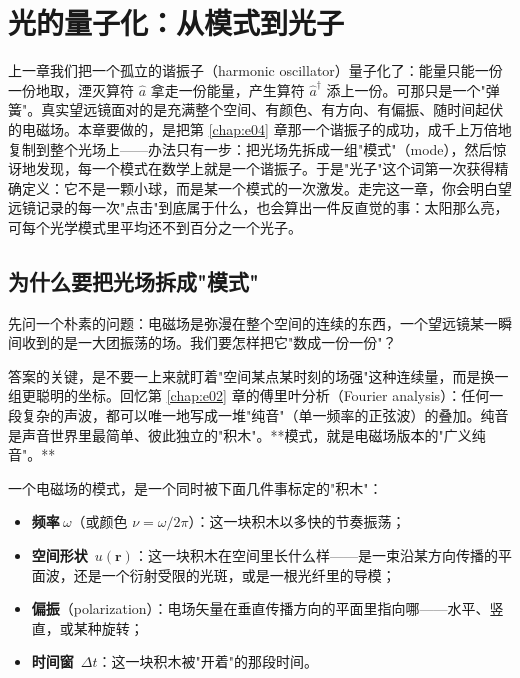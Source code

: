 \chapter{光的量子化：从模式到光子}
\label{chap:e05}

\begin{chapteropening}
上一章我们把一个孤立的谐振子（harmonic oscillator）量子化了：能量只能一份一份地取，湮灭算符 \(\hat a\) 拿走一份能量，产生算符 \(\hat a^\dagger\) 添上一份。可那只是一个"弹簧"。真实望远镜面对的是充满整个空间、有颜色、有方向、有偏振、随时间起伏的电磁场。本章要做的，是把第 \ref{chap:e04} 章那一个谐振子的成功，成千上万倍地复制到整个光场上——办法只有一步：把光场先拆成一组"模式"（mode），然后惊讶地发现，每一个模式在数学上就是一个谐振子。于是"光子"这个词第一次获得精确定义：它不是一颗小球，而是某一个模式的一次激发。走完这一章，你会明白望远镜记录的每一次"点击"到底属于什么，也会算出一件反直觉的事：太阳那么亮，可每个光学模式里平均还不到百分之一个光子。
\end{chapteropening}

\section{为什么要把光场拆成"模式"}
\label{sec:e05-why-modes}

先问一个朴素的问题：电磁场是弥漫在整个空间的连续的东西，一个望远镜某一瞬间收到的是一大团振荡的场。我们要怎样把它"数成一份一份"？

答案的关键，是不要一上来就盯着"空间某点某时刻的场强"这种连续量，而是换一组更聪明的坐标。回忆第 \ref{chap:e02} 章的傅里叶分析（Fourier analysis）：任何一段复杂的声波，都可以唯一地写成一堆"纯音"（单一频率的正弦波）的叠加。纯音是声音世界里最简单、彼此独立的"积木"。**模式，就是电磁场版本的"广义纯音"。**

一个电磁场的模式，是一个同时被下面几件事标定的"积木"：

\begin{itemize}
  \item \textbf{频率}\(\ \omega\)（或颜色 \(\nu=\omega/2\pi\)）：这一块积木以多快的节奏振荡；
  \item \textbf{空间形状}\ \(u(\bm r)\)：这一块积木在空间里长什么样——是一束沿某方向传播的平面波，还是一个衍射受限的光斑，或是一根光纤里的导模；
  \item \textbf{偏振}（polarization）：电场矢量在垂直传播方向的平面里指向哪——水平、竖直，或某种旋转；
  \item \textbf{时间窗}\ \(\Delta t\)：这一块积木被"开着"的那段时间。
\end{itemize}

